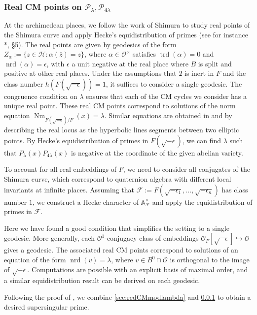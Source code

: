 \documentclass{amsart}
\numberwithin{equation}{subsection}
\numberwithin{theorem}{section}
\theoremstyle{definition}
\theoremstyle{remark}
\newcommand{\bA}{\mathbb{A}}
\newcommand{\cF}{\mathcal{F}}
\newcommand{\cO}{\mathcal{O}}
\DeclareMathOperator{\Nm}{Nm}
\DeclareMathOperator{\trd}{trd}
\DeclareMathOperator{\nrd}{nrd}
\begin{document}
\subsubsection{Real CM points on $\mathcal{P}_{\lambda}, \mathcal{P}_{4\lambda}$}\label{sec:realCMpointsonPoly}
At the archimedean places, we follow the work of Shimura \cite{MR572971} to study real points of the Shimura curve and apply Hecke's equidistribution of primes (see for instance \cite{MR1282723}*{\MakeUppercase{}, \S5}). 
The real points are given by geodesics of the form $Z_{\alpha} := \{z\in \mathcal{H}: \alpha(\overline{z}) = z\}$, where $\alpha \in \cO^\times $ satisfies $\trd(\alpha) = 0$ and $\nrd(\alpha)=\epsilon$, with $\epsilon$ a unit negative at the real place where $B$ is split and positive at other real places. Under the assumptions that $2$ is inert in $F$ and the class number $h(F(\sqrt{-\epsilon})) = 1$, it suffices to consider a single geodesic. The congruence condition on $\lambda$ ensures that each of the CM cycles we consider has a unique real point. These real CM points correspond to solutions of the norm equation $\Nm_{F(\sqrt{-\epsilon})/F} (x) = \lambda$. Similar equations are obtained in \cite{MR2704678} and \cite{MR2414789} by describing the real locus as the hyperbolic lines segments between two elliptic points. By Hecke's equidistribution of primes in $F(\sqrt{-\epsilon})$, we can find $\lambda$ such that $P_{\lambda}(x) P_{4\lambda}(x)$ is negative at the coordinate of the given abelian variety. 

To account for all real embeddings of $F$, we need to consider all conjugates of the Shimura curve, which correspond to quaternion algebra with different local invariants at infinite places. Assuming that $\cF := F(\sqrt{-\epsilon_1}, \dotsc, \sqrt{-\epsilon_n})$ has class number $1$, we construct a Hecke character of $\bA_{\cF}^\times$ and apply the equidistribution of primes in $\cF$.

Here we have found a good condition that simplifies the setting to a single geodesic. More generally, each $\cO^1$-conjugacy class of embeddings $\cO_F[\sqrt{-\epsilon}] \hookrightarrow \cO$ gives a geodesic. The associated real CM points correspond to solutions of an equation of the form $\nrd(v) = \lambda$, where $v \in B^0 \cap \cO$ is orthogonal to the image of $\sqrt{-\epsilon}$. Computations are possible with an explicit basis of maximal order, and a similar equidistribution result can be derived on each geodesic. 

\vspace{1em}
Following the proof of \cite{MR903384}, we combine \ref{sec:redCMmodlambda} and \ref{sec:realCMpointsonPoly} to obtain a desired supersingular prime. 
\end{document}
